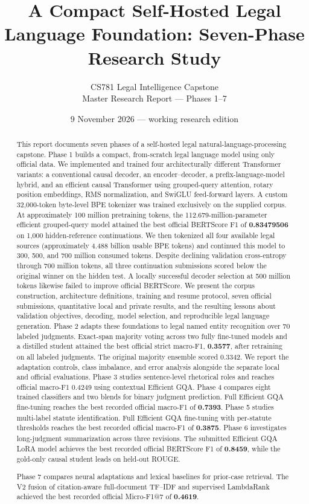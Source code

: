 \documentclass[11pt,a4paper]{article}
\title{A Compact Self-Hosted Legal Language Foundation: Seven-Phase Research Study}
\author{CS781 Legal Intelligence Capstone\\\small Master Research Report --- Phases 1--7}
\date{9 November 2026 --- working research edition}
\begin{document}
\maketitle
\begin{abstract}
This report documents seven phases of a self-hosted legal natural-language-processing capstone. Phase 1 builds a compact, from-scratch legal language model using only official data. We implemented and trained four architecturally different Transformer variants: a conventional causal decoder, an encoder--decoder, a prefix-language-model hybrid, and an efficient causal Transformer using grouped-query attention, rotary position embeddings, RMS normalization, and SwiGLU feed-forward layers. A custom 32,000-token byte-level BPE tokenizer was trained exclusively on the supplied corpus. At approximately 100 million pretraining tokens, the 112.679-million-parameter efficient grouped-query model attained the best official BERTScore F1 of \textbf{0.83479506} on 1,000 hidden-reference continuations. We then tokenized all four available legal sources (approximately 4.488 billion usable BPE tokens) and continued this model to 300, 500, and 700 million consumed tokens. Despite declining validation cross-entropy through 700 million tokens, all three continuation submissions scored below the original winner on the hidden test. A locally successful decoder selection at 500 million tokens likewise failed to improve official BERTScore. We present the corpus construction, architecture definitions, training and resume protocol, seven official submissions, quantitative local and private results, and the resulting lessons about validation objectives, decoding, model selection, and reproducible legal language generation. Phase 2 adapts these foundations to legal named entity recognition over 70 labeled judgments. Exact-span majority voting across two fully fine-tuned models and a distilled student attained the best official strict macro-F1, \textbf{0.3577}, after retraining on all labeled judgments. The original majority ensemble scored 0.3342. We report the adaptation controls, class imbalance, and error analysis alongside the separate local and official evaluations. Phase 3 studies sentence-level rhetorical roles and reaches official macro-F1 0.4249 using contextual Efficient GQA. Phase 4 compares eight trained classifiers and two blends for binary judgment prediction. Full Efficient GQA fine-tuning reaches the best recorded official macro-F1 of \textbf{0.7393}. Phase 5 studies multi-label statute identification. Full Efficient GQA fine-tuning with per-statute thresholds reaches the best recorded official macro-F1 of \textbf{0.3875}. Phase 6 investigates long-judgment summarization across three revisions. The submitted Efficient GQA LoRA model achieves the best recorded official BERTScore F1 of \textbf{0.8459}, while the gold-only causal student leads on held-out ROUGE.
\par\smallskip
Phase 7 compares neural adaptations and lexical baselines for prior-case retrieval. The V2 fusion of citation-aware full-document TF--IDF and supervised LambdaRank achieved the best recorded official Micro-F1@7 of \textbf{0.4619}.
\end{abstract}
\tableofcontents
\newpage
\end{document}
